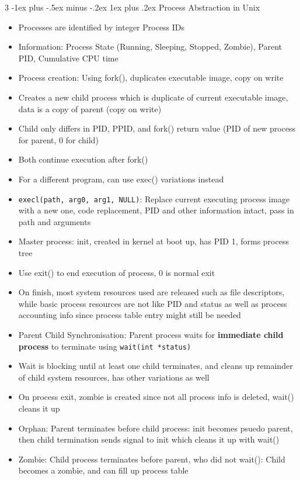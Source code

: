 \documentclass[10pt, landscape]{article}
\makeatletter
\renewcommand{\subsection}{\@startsection{subsection}{3}{0mm}%
                                {-1ex plus -.5ex minus -.2ex}%
                                {1ex plus .2ex}%
                                {\normalfont\small\bfseries}}%
\makeatother
\begin{document}
\begin{multicols*}{3}
\subsection{Process Abstraction in Unix}
\begin{itemize}
    \item Processes are identified by integer Process IDs
    \item Information: Process State (Running, Sleeping, Stopped, Zombie), Parent PID, Cumulative CPU time
    \item Process creation: Using fork(), duplicates executable image, copy on write
    \item Creates a new child process which is duplicate of current executable image, data is a copy of parent (copy on write)
    \item Child only differs in PID, PPID, and fork() return value (PID of new process for parent, 0 for child)
    \item Both continue execution after fork()
    \item For a different program, can use exec() variations instead
    \item \verb|execl(path, arg0, arg1, NULL)|: Replace current executing process image with a new one, code replacement, PID and other information intact, pass in path and arguments
    \item Master process: init, created in kernel at boot up, has PID 1, forms process tree
    \item Use exit() to end execution of process, 0 is normal exit
    \item On finish, most system resources used are released such as file descriptors, while basic process resources are not like PID and status as well as process accounting info since process table entry might still be needed
    \item Parent Child Synchronisation: Parent process waits for \textbf{immediate child process} to terminate using \verb|wait(int *status)|
    \item Wait is blocking until at least one child terminates, and cleans up remainder of child system resources, has other variations as well
    \item On process exit, zombie is created since not all process info is deleted, wait() cleans it up
    \item Orphan: Parent terminates before child process: init becomes psuedo parent, then child termination sends signal to init which cleans it up with wait()
    \item Zombie: Child process terminates before parent, who did not wait(): Child becomes a zombie, and can fill up process table
\end{itemize}


\end{multicols*}
\end{document}
